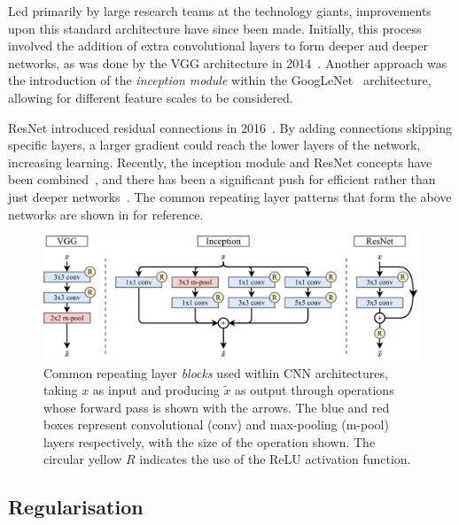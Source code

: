 Led primarily by large research teams at the technology giants, improvements upon this standard
architecture have since been made. Initially, this process involved the addition of extra
convolutional layers to form deeper and deeper networks, as was done by the VGG architecture in
2014~\cite{simonyan2014}. Another approach was the introduction of the \emph{inception module}
within the GoogLeNet~\cite{szegedy2015} architecture, allowing for different feature scales to be
considered.

ResNet introduced residual connections in 2016~\cite{he2016_original, he2016_improved}. By adding
connections skipping specific layers, a larger gradient could reach the lower layers of the
network, increasing learning. Recently, the inception module and ResNet concepts have been
combined~\cite{szegedy2016}, and there has been a significant push for efficient rather than just
deeper networks~\cite{sandler2018, tan2019}. The common repeating layer patterns that form the
above networks are shown in  for reference.

\begin{figure} %
    \includegraphics[width=\textwidth]{diagrams/6-cnn/blocks.pdf}
    \caption[Common Convolutional Neural Network architecture blocks]
    {Common repeating layer \emph{blocks} used within CNN architectures, taking $x$ as input and
        producing $\tilde{x}$ as output through operations whose forward pass is shown with the
        arrows. The blue and red boxes represent convolutional (conv) and max-pooling (m-pool)
        layers respectively, with the size of the operation shown. The circular yellow $R$
        indicates the use of the ReLU activation function.}
    \label{fig:blocks}
\end{figure}

\subsection{Regularisation} %
\label{sec:cnn_theory_reg} %

